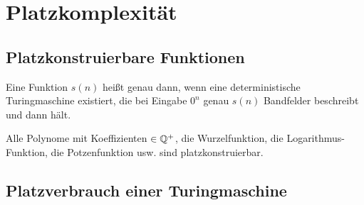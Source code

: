 




\chapter{Platzkomplexität} %
\label{cha:platzkomplexitaet}




\section{Platzkonstruierbare Funktionen}


\begin{definition}

    Eine Funktion $s(n)$ heißt  genau dann, wenn eine deterministische Turingmaschine existiert, die bei Eingabe $0^n$ genau $s(n)$ Bandfelder beschreibt und dann hält.

\end{definition}

\begin{beispiel}

    Alle Polynome mit Koeffizienten $\in \mathbb{Q}^+$, die Wurzelfunktion, die Logarithmus-Funktion, die Potzenfunktion usw. sind platzkonstruierbar.

\end{beispiel}




\section{Platzverbrauch einer Turingmaschine}

